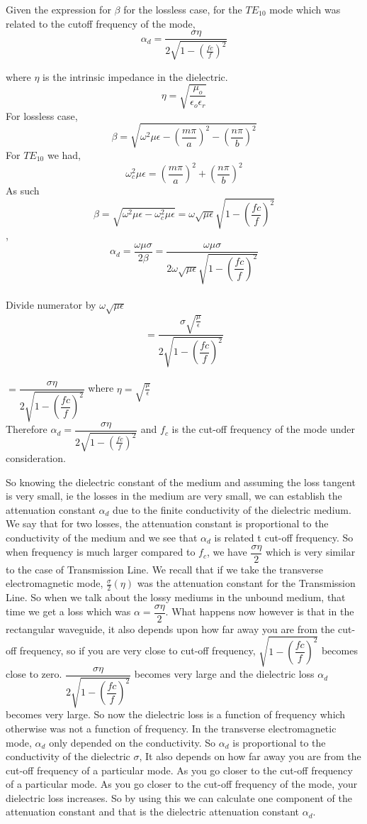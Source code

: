 	Given the expression for $\beta$ for the lossless case, for the $TE_{10}$ mode which was related to the cutoff frequency of the mode, 
$$
	\alpha_{d} =  \frac{\sigma\eta}{2\sqrt{1-(\frac{fc}{f})^{2}}}
$$

	where $\eta$ is the intrinsic impedance in the dielectric.
$$	
\eta =  \sqrt{\frac{\mu_{o}}{\epsilon_{o}\epsilon_{r}}}
$$
For lossless case, 
$$\beta = \sqrt{\omega^{2}\mu\epsilon-(\dfrac{m\pi}{a})^{2}-(\dfrac{n\pi}{b})^{2}}$$
For $TE_{10}$ we had, $$\omega^{2}_{c}\mu\epsilon = (\dfrac{m\pi}{a})^{2}+(\dfrac{n\pi}{b})^{2}$$	
As such $$\beta = \sqrt{\omega^{2}\mu\epsilon-\omega^{2}_{c}\mu\epsilon} = \omega\sqrt{\mu\epsilon}\sqrt{1-(\dfrac{fc}{f})^{2}}$$,	
$$\alpha_{d}=\dfrac{\omega\mu\sigma}{2\beta}= \dfrac{\omega\mu\sigma}{2\omega\sqrt{\mu\epsilon}\sqrt{1-(\dfrac{fc}{f})^{2}}}$$\\
Divide numerator by $\omega\sqrt{\mu\epsilon}$
$$= \dfrac{\sigma\sqrt{\frac{\mu}{\epsilon}}}{2\sqrt{1-(\dfrac{fc}{f})^{2}}}$$\\
$=\dfrac{\sigma\eta}{2\sqrt{1 - (\dfrac{fc}{f})^{2}}}$ where $\eta= \sqrt{\frac{\mu}{\epsilon}}$\\
Therefore $\alpha_{d} = \dfrac{\sigma\eta}{2\sqrt{1 -(\frac{fc}{f})^{2}}}$ and $f_c$ is the cut-off frequency of the mode under consideration.


	So knowing the dielectric constant of the medium and assuming the loss tangent is very small, ie the losses in the medium are very small, we can establish the attenuation constant $\alpha_{d}$ due to the finite conductivity of the dielectric medium. We say that for two losses, the attenuation constant is proportional to the conductivity of the medium and we see that $\alpha_{d}$ is related t cut-off frequency.
	So when frequency is much larger compared to $f_{c}$, we have $\dfrac{\sigma\eta}{2}$ which is very similar to the case of Transmission Line. We recall that if we take the transverse electromagnetic mode, $\frac{\sigma}{2}(\eta)$ was the attenuation constant for the Transmission Line.
	So when we talk about the lossy mediums in the unbound medium, that time we get a loss which was $\alpha = \dfrac{\sigma\eta}{2}$. What happens now however is that in the rectangular waveguide, it also depends upon how far away you are from the cut-off frequency, so if you are very close to cut-off frequency, $\sqrt{1 - (\dfrac{fc}{f})^{2}}$ becomes close to zero.
	$\dfrac{\sigma\eta}{2\sqrt{1-(\dfrac{fc}{f})^{2}}}$ becomes very large and the dielectric loss $\alpha_{d}$ becomes very large. So now the dielectric loss is a function of frequency which otherwise was not a function of frequency. In the transverse electromagnetic mode,  $\alpha_{d}$ only depended on the conductivity. So $\alpha_{d}$ is proportional to the conductivity of the dielectric $\sigma$, It also depends on how far away you are from the cut-off frequency of a particular mode. As you go closer to the cut-off frequency of a particular mode. As you go closer to the cut-off frequency of the mode, your dielectric loss increases. So by using this we can calculate one component of the attenuation constant and that is the dielectric attenuation constant $\alpha_{d}$.
	
